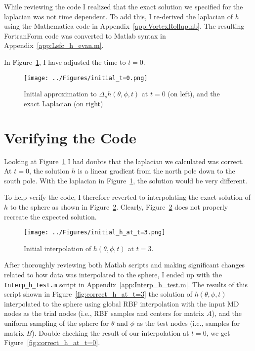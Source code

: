 \documentclass[letter,10pt]{article}
\begin{document}
While reviewing the code I realized that the exact solution we specified for the laplacian was not time dependent. To 
add this, I re-derived the laplacian of $h$ using the Mathematica code in Appendix~\ref{app:VortexRollup.nb}. The resulting FortranForm code was converted to Matlab syntax in Appendix~\ref{app:Lsfc_h_evan.m}. 

In Figure~\ref{fig:initial_t=0}, I have adjusted the time to $t=0$. 

\begin{figure}[h]
\begin{center}
\texttt{[image: ../Figures/initial\_t=0.png]}
\caption{Initial approximation to $\Delta_{s} h(\theta,\phi,t)$ at $t=0$ (on left), and the exact Laplacian (on right)}
\label{fig:initial_t=0}
\end{center}
\end{figure}

\section{Verifying the Code}

Looking at Figure~\ref{fig:initial_t=0} I had doubts that the laplacian we calculated was correct. At $t=0$, the solution $h$ is a linear gradient from the north pole down to the south pole. With the laplacian in Figure~\ref{fig:initial_t=0}, the solution would be very different. 

To help verify the code, I therefore reverted to interpolating the exact solution of $h$ to the sphere as shown in Figure~\ref{fig:initial_h_at_t=3}. Clearly, Figure~\ref{fig:initial_h_at_t=3} does not properly recreate the expected solution. 

\begin{figure}[h]
\begin{center} 
\texttt{[image: ../Figures/initial\_h\_at\_t=3.png]}
\caption{Initial interpolation of $h(\theta,\phi,t)$ at $t=3$.}
\label{fig:initial_h_at_t=3}
\end{center}
\end{figure}

After thoroughly reviewing both Matlab scripts and making significant changes related to how data was interpolated to the sphere, 
I  ended up with the \verb|Interp_h_test.m| script in Appendix~\ref{app:Interp_h_test.m}. The results of this script shown in 
Figure~\ref{fig:correct_h_at_t=3} the solution of $h(\theta, \phi, t)$ interpolated to the sphere using global RBF interpolation with the input 
MD nodes as the trial nodes (i.e., RBF samples and centers for matrix $A$), and the uniform sampling of the sphere for
 $\theta$ and $\phi$ as the test nodes (i.e., samples for matrix $B$). Double checking the result of our interpolation at $t=0$, we get Figure~\ref{fig:correct_h_at_t=0}. 
\end{document}
